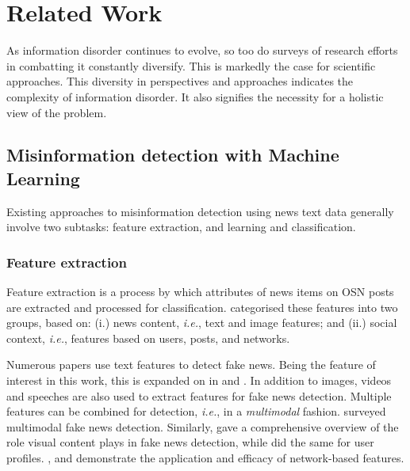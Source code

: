 \chapter{Related Work}\label{ch:related-work}

As information disorder continues to evolve, so too do surveys of research efforts in combatting it constantly diversify. This is markedly the case for scientific approaches. This diversity in perspectives and approaches indicates the complexity of information disorder. It also signifies the necessity for a holistic view of the problem.

\section{Misinformation detection with Machine Learning}
\label{sec:2-mdml}

Existing approaches to misinformation detection using news text data generally involve two subtasks: feature extraction, and learning and classification.

\subsection{Feature extraction}
\label{ssec:2-feature-extraction}

Feature extraction is a process by which attributes of news items on \ac{OSN} posts are extracted and processed for classification.  categorised these features into two groups, based on: (i.) news content, \emph{i.e.}, text and image features; and (ii.) social context, \emph{i.e.}, features based on users, posts, and networks.

Numerous papers use text features to detect fake news. Being the feature of interest in this work, this is expanded on in  and . In addition to images, videos and speeches are also used to extract features for fake news detection. Multiple features can be combined for detection, \emph{i.e.}, in a \emph{multimodal} fashion.  surveyed multimodal fake news detection. Similarly,  gave a comprehensive overview of the role visual content plays in fake news detection, while  did the same for user profiles. , and  demonstrate the application and efficacy of network-based features.


